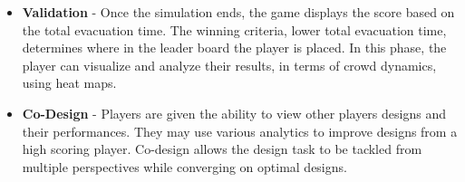 \begin{itemize}
\item \textbf{Validation} - Once the simulation ends, the game displays the score based on the total evacuation time. The winning criteria, lower total evacuation time, determines where in the leader board the player is placed. In this phase, the player can visualize and analyze their results, in terms of crowd dynamics, using heat maps.

\item \textbf{Co-Design} - Players are given the ability to view other players designs and their performances. They may use various analytics to improve designs from a high scoring player. Co-design allows the design task to be tackled from multiple perspectives while converging on optimal designs.
\end{itemize}